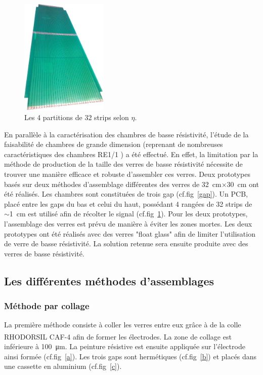 \begin{figure}
	\vspace*{-1cm}
	\centering
	\includegraphics[width=0.37\textwidth]{GLA/strips.jpg}
	\caption{Les \num{4} partitions de \num{32} strips selon $\eta$.}
	\label{strips}
\end{figure}

En parallèle à la caractérisation des chambres de basse résistivité, l'étude de la faisabilité de chambres de grande dimension (reprenant de nombreuses caractéristiques des chambres RE1/1 \cite{gapss}) a été effectué. En effet, la limitation par la méthode de production de la taille des verres de basse résistivité nécessite de trouver une manière efficace et robuste d'assembler ces verres.  Deux prototypes basés sur deux méthodes d'assemblage différentes des verres de \SI{32}{\centi\meter}$\times$\SI{30}{\centi\meter} ont été réalisés. Les chambres sont constituées de trois gap (cf.fig~\ref{gap}). Un PCB, placé entre les gaps du bas et celui du haut, possédant \num{4} rangées de \num{32} strips de $\sim$\SI{1}{\centi\meter} est utilisé afin de récolter le signal (cf.fig~\ref{strips}). Pour les deux prototypes, l'assemblage des verres est prévu de manière à éviter les zones mortes. Les deux prototypes ont été réalisés avec des verres "float glass" afin de limiter l'utilisation de verre de basse résistivité. La solution retenue sera ensuite produite avec des verres de basse résistivité.

\subsection{Les différentes méthodes d'assemblages} 
\subsubsection{Méthode par collage}
La première méthode consiste à coller les verres entre eux grâce à de la colle RHODORSIL\textsuperscript{\textregistered}
 CAF-4 afin de former les électrodes. La zone de collage est inférieure à \SI{100}{\micro\meter}. La peinture résistive est ensuite appliquée sur l'électrode ainsi formée (cf.fig~\ref{a}). Les trois gaps sont hermétiques (cf.fig~\ref{b}) et placés dans une cassette en aluminium (cf.fig~\ref{c}).
 
